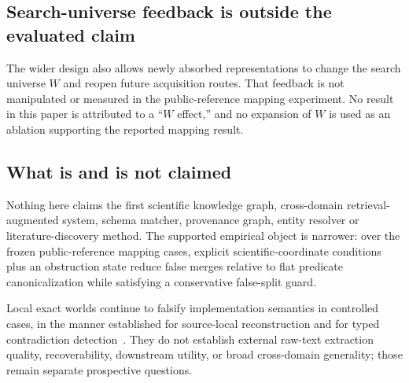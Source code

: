 \subsection{Search-universe feedback is outside the evaluated claim}

The wider design also allows newly absorbed representations to change the
search universe $W$ and reopen future acquisition routes. That feedback is not
manipulated or measured in the public-reference mapping experiment. No result
in this paper is attributed to a ``$W$ effect,'' and no expansion of $W$ is
used as an ablation supporting the reported mapping result.

\subsection{What is and is not claimed}

Nothing here claims the first scientific knowledge graph, cross-domain
retrieval-augmented system, schema matcher, provenance graph, entity resolver
or literature-discovery method. The supported empirical object is narrower:
over the frozen public-reference mapping cases, explicit scientific-coordinate
conditions plus an obstruction state reduce false merges relative to flat
predicate canonicalization while satisfying a conservative false-split guard.

Local exact worlds continue to falsify implementation semantics in controlled
cases, in the manner established for source-local reconstruction and for typed
contradiction detection~\cite{orion2025paper1,orion2025paper2}. They do not
establish external raw-text extraction quality, recoverability, downstream
utility, or broad cross-domain generality; those remain separate prospective
questions.

\endinput
